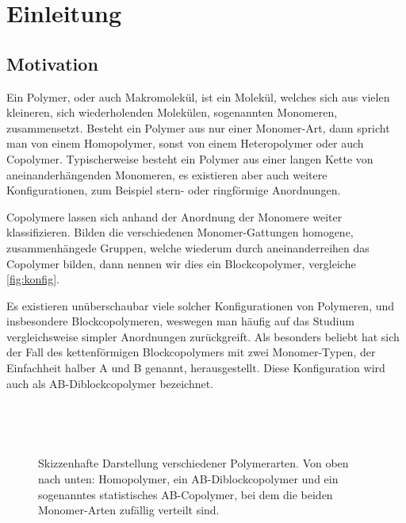 
\chapter{Einleitung} %
\label{cha:einleitung}

\section{Motivation} %
\label{sec:motivation}

Ein Polymer, oder auch Makromolekül, ist ein Molekül, welches sich aus vielen kleineren, sich wiederholenden Molekülen, sogenannten Monomeren, zusammensetzt.
Besteht ein Polymer aus nur einer Monomer-Art, dann spricht man von einem Homopolymer, sonst von einem Heteropolymer oder auch Copolymer.
Typischerweise besteht ein Polymer aus einer langen Kette von aneinanderhängenden Monomeren, es existieren aber auch weitere Konfigurationen, zum Beispiel stern- oder ringförmige Anordnungen.

Copolymere lassen sich anhand der Anordnung der Monomere weiter klassifizieren.
Bilden die verschiedenen Monomer-Gattungen homogene, zusammenhängede Gruppen, welche wiederum durch aneinanderreihen das Copolymer bilden, dann nennen wir dies ein Blockcopolymer, vergleiche \autoref{fig:konfig}.

Es existieren unüberschaubar viele solcher Konfigurationen von Polymeren, und insbesondere Blockcopolymeren, weswegen man häufig auf das Studium vergleichsweise simpler Anordnungen zurückgreift.
Als besonders beliebt hat sich der Fall des kettenförmigen Blockcopolymers mit zwei Monomer-Typen, der Einfachheit halber A und B genannt, herausgestellt.
Diese Konfiguration wird auch als AB-Diblockcopolymer bezeichnet.

\begin{figure}[tb]
    \centering
    \begin{subfigure}[b]{\textwidth}
        \centering
        
    \end{subfigure}
    \\[1em]
    \begin{subfigure}[b]{\textwidth}
        \centering
        
    \end{subfigure}
    \\[1em]
    \begin{subfigure}[b]{\textwidth}
        \centering
        
    \end{subfigure}
    \caption[Skizzenhafte Darstellung verschiedener Polymerarten]{%
        Skizzenhafte Darstellung verschiedener Polymerarten.
        Von oben nach unten: Homopolymer, ein AB-Diblockcopolymer und ein sogenanntes statistisches AB-Copolymer, bei dem die beiden Monomer-Arten zufällig verteilt sind.
    }
    \label{fig:konfig}
\end{figure}

